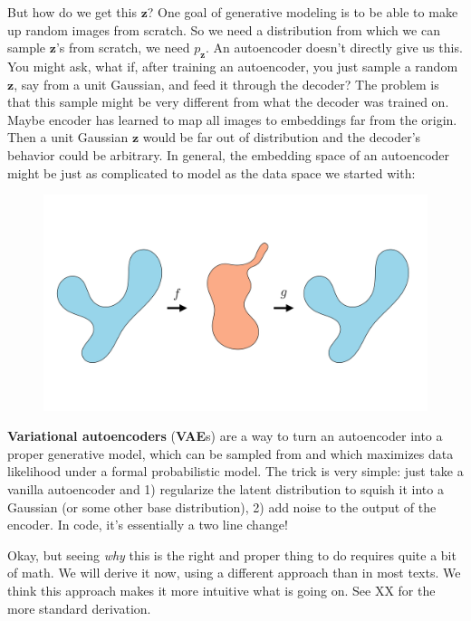 But how do we get this $\mathbf{z}$? One goal of generative modeling is to be able to make up random images from scratch. So we need a distribution from which we can sample $\mathbf{z}$'s from scratch, we need $p_{\mathbf{z}}$. An autoencoder doesn't directly give us this. You might ask, what if, after training an autoencoder, you just sample a random $\mathbf{z}$, say from a unit Gaussian, and feed it through the decoder? The problem is that this sample might be very different from what the decoder was trained on. Maybe encoder has learned to map all images to embeddings far from the origin. Then a unit Gaussian $\mathbf{z}$ would be far out of distribution and the decoder's behavior could be arbitrary. %
\newpage
In general, the embedding space of an autoencoder might be just as complicated to model as the data space we started with:%
\begin{figure}[h!]
    \centering
    \includegraphics[width=0.6\linewidth]{./figures/generative_modeling_and_representation_learning/autoencoder_complicated_latent_space.pdf}
    \label{fig:generative_modeling_and_representation_learning:autoencoder_complicated_latent_space}
\end{figure}


\textbf{Variational autoencoders} (\textbf{VAE}s) are a way to turn an autoencoder into a proper generative model, which can be sampled from and which maximizes data likelihood under a formal probabilistic model. The trick is very simple: just take a vanilla autoencoder and 1) regularize the latent distribution to squish it into a Gaussian (or some other base distribution), 2) add noise to the output of the encoder. In code, it's essentially a two line change!

Okay, but seeing \textit{why} this is the right and proper thing to do requires quite a bit of math. We will derive it now, using a different approach than in most texts. We think this approach makes it more intuitive what is going on. See XX for the more standard derivation.

